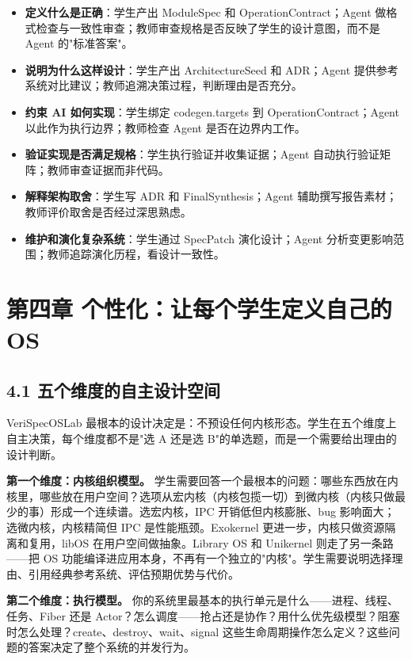 \documentclass[UTF8,a4paper,12pt,openany]{ctexrep}
\providecommand{\tightlist}{\setlength{\itemsep}{0pt}\setlength{\parskip}{0pt}}
\begin{document}
\begin{itemize}
\tightlist
\item
  \textbf{定义什么是正确}：学生产出 ModuleSpec 和 OperationContract；Agent 做格式检查与一致性审查；教师审查规格是否反映了学生的设计意图，而不是 Agent 的"标准答案"。
\item
  \textbf{说明为什么这样设计}：学生产出 ArchitectureSeed 和 ADR；Agent 提供参考系统对比建议；教师追溯决策过程，判断理由是否充分。
\item
  \textbf{约束 AI 如何实现}：学生绑定 codegen.targets 到 OperationContract；Agent 以此作为执行边界；教师检查 Agent 是否在边界内工作。
\item
  \textbf{验证实现是否满足规格}：学生执行验证并收集证据；Agent 自动执行验证矩阵；教师审查证据而非代码。
\item
  \textbf{解释架构取舍}：学生写 ADR 和 FinalSynthesis；Agent 辅助撰写报告素材；教师评价取舍是否经过深思熟虑。
\item
  \textbf{维护和演化复杂系统}：学生通过 SpecPatch 演化设计；Agent 分析变更影响范围；教师追踪演化历程，看设计一致性。
\end{itemize}


\chapter{第四章 个性化：让每个学生定义自己的 OS}\label{ux7b2cux56dbux7ae0-ux4e2aux6027ux5316ux8ba9ux6bcfux4e2aux5b66ux751fux5b9aux4e49ux81eaux5df1ux7684-os}

\section{4.1 五个维度的自主设计空间}\label{41-ux4e94ux4e2aux7ef4ux5ea6ux7684ux81eaux4e3bux8bbeux8ba1ux7a7aux95f4}

VeriSpecOSLab 最根本的设计决定是：不预设任何内核形态。学生在五个维度上自主决策，每个维度都不是"选 A 还是选 B"的单选题，而是一个需要给出理由的设计判断。

\textbf{第一个维度：内核组织模型。} 学生需要回答一个最根本的问题：哪些东西放在内核里，哪些放在用户空间？选项从宏内核（内核包揽一切）到微内核（内核只做最少的事）形成一个连续谱。选宏内核，IPC 开销低但内核膨胀、bug 影响面大；选微内核，内核精简但 IPC 是性能瓶颈。Exokernel 更进一步，内核只做资源隔离和复用，libOS 在用户空间做抽象。Library OS 和 Unikernel 则走了另一条路------把 OS 功能编译进应用本身，不再有一个独立的"内核"。学生需要说明选择理由、引用经典参考系统、评估预期优势与代价。

\textbf{第二个维度：执行模型。} 你的系统里最基本的执行单元是什么------进程、线程、任务、Fiber 还是 Actor？怎么调度------抢占还是协作？用什么优先级模型？阻塞时怎么处理？create、destroy、wait、signal 这些生命周期操作怎么定义？这些问题的答案决定了整个系统的并发行为。
\end{document}
